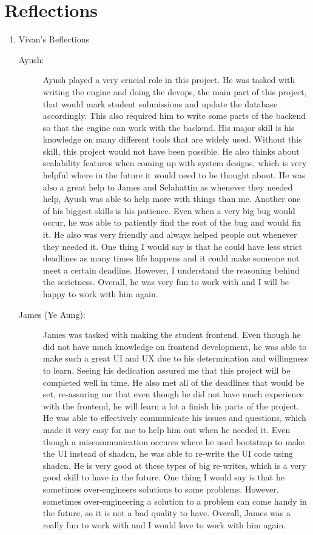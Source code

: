 \documentclass[a4paper, 12pt]{article}
\begin{document}
\section*{Reflections}
\begin{enumerate}
    \item Vivan's Reflections
        \begin{description}
            \item[Ayush: ] Ayush played a very crucial role in this project. He was tasked with writing the engine and doing the devops, the main part of this project, that would mark student submissions and update the database accordingly. This also required him to write some parts of the backend so that the engine can work with the backend. His major skill is his knowledge on many different tools that are widely used. Without this skill, this project would not have been possible. He also thinks about scalability features when coming up with system designs, which is very helpful where in the future it would need to be thought about. He was also a great help to James and Selahattin as whenever they needed help, Ayush was able to help more with things than me. Another one of his biggest skills is his patience. Even when a very big bug would occur, he was able to patiently find the root of the bug and would fix it. He also was very friendly and always helped people out whenever they needed it. One thing I would say is that he could have less strict deadlines as many times life happens and it could make someone not meet a certain deadline. However, I understand the reasoning behind the scrictness. Overall, he was very fun to work with and I will be happy to work with him again.
            \item[James (Ye Aung): ] James was tasked with making the student frontend. Even though he did not have much knowledge on frontend development, he was able to make such a great UI and UX due to his determination and willingness to learn. Seeing his dedication assured me that this project will be completed well in time. He also met all of the deadlines that would be set, re-assuring me that even though he did not have much experience with the frontend, he will learn a lot a finish his parts of the project. He was able to effectively communicate his issues and questions, which made it very easy for me to help him out when he needed it. Even though a miscommunication occures where he used bootstrap to make the UI instead of shadcn, he was able to re-write the UI code using shadcn. He is very good at these types of big re-writes, which is a very good skill to have in the future. One thing I would say is that he sometimes over-engineers solutions to some problems. However, sometimes over-engineering a solution to a problem can come handy in the future, so it is not a bad quality to have. Overall, James was a really fun to work with and I would love to work with him again.

\end{description}
\end{enumerate}
\end{document}
